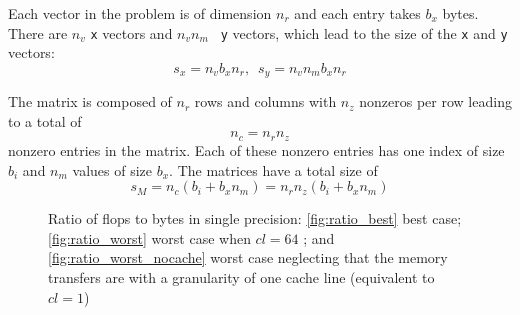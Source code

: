 \documentclass{sig-alternate}
\begin{document}
Each vector in the problem is of dimension $n_r$ and each entry
takes $b_x$ bytes. There are $n_v$ {\tt x} vectors and $n_v n_m$ {\tt
  y} vectors, which lead to the size of the {\tt x} and {\tt y} vectors:
$$s_x = n_v b_x n_r\mbox{, ~}s_y = n_v n_m b_x n_r$$

The matrix is composed of $n_r$ rows and columns with $n_z$ nonzeros
per row leading to a total of $$n_c = n_r n_z$$ nonzero entries in
the matrix. Each of these nonzero entries has one index of size $b_i$
and $n_m$ values of size $b_x$. The matrices have a total size
of $$s_M = n_c (b_i + b_x n_m) = n_r n_z (b_i + b_x n_m)$$

\begin{figure}[tbh]
  \centering
  
  \caption{Ratio of flops to bytes in single precision:  
    \ref{fig:ratio_best} best case; \ref{fig:ratio_worst} worst case when $cl=64$ 
    ; and \ref{fig:ratio_worst_nocache} worst case neglecting that the
    memory transfers are with a granularity of one cache line (equivalent to $cl = 1$)}
  \label{fig:ratio_bytes_flops}
\end{figure}
\end{document}
